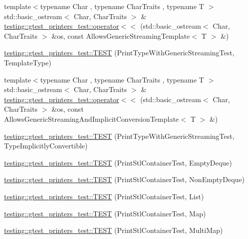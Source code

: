 \begin{DoxyCompactItemize}
\item 
{\footnotesize template$<$typename Char , typename Char\+Traits , typename T $>$ }\\std\+::basic\+\_\+ostream$<$ Char, Char\+Traits $>$ \& \mbox{\hyperlink{namespacetesting_1_1gtest__printers__test_a5464168e925b1adf29986c8e544e908e}{testing\+::gtest\+\_\+printers\+\_\+test\+::operator$<$$<$}} (std\+::basic\+\_\+ostream$<$ Char, Char\+Traits $>$ \&os, const Allows\+Generic\+Streaming\+Template$<$ T $>$ \&)
\item 
\mbox{\hyperlink{namespacetesting_1_1gtest__printers__test_a6e180c85f307712a995985f7bc735fd1}{testing\+::gtest\+\_\+printers\+\_\+test\+::\+T\+E\+ST}} (Print\+Type\+With\+Generic\+Streaming\+Test, Template\+Type)
\item 
{\footnotesize template$<$typename Char , typename Char\+Traits , typename T $>$ }\\std\+::basic\+\_\+ostream$<$ Char, Char\+Traits $>$ \& \mbox{\hyperlink{namespacetesting_1_1gtest__printers__test_a09eedfbca613302efe6438d2a537f419}{testing\+::gtest\+\_\+printers\+\_\+test\+::operator$<$$<$}} (std\+::basic\+\_\+ostream$<$ Char, Char\+Traits $>$ \&os, const Allows\+Generic\+Streaming\+And\+Implicit\+Conversion\+Template$<$ T $>$ \&)
\item 
\mbox{\hyperlink{namespacetesting_1_1gtest__printers__test_a68877c5e1ec7a53281798310c30e1776}{testing\+::gtest\+\_\+printers\+\_\+test\+::\+T\+E\+ST}} (Print\+Type\+With\+Generic\+Streaming\+Test, Type\+Implicitly\+Convertible)
\item 
\mbox{\hyperlink{namespacetesting_1_1gtest__printers__test_a1ce10b8a3634e0f6bfbfbb5888c04a95}{testing\+::gtest\+\_\+printers\+\_\+test\+::\+T\+E\+ST}} (Print\+Stl\+Container\+Test, Empty\+Deque)
\item 
\mbox{\hyperlink{namespacetesting_1_1gtest__printers__test_a249d482cf4a1525bd043489dcbd3e200}{testing\+::gtest\+\_\+printers\+\_\+test\+::\+T\+E\+ST}} (Print\+Stl\+Container\+Test, Non\+Empty\+Deque)
\item 
\mbox{\hyperlink{namespacetesting_1_1gtest__printers__test_aaa135672ff79ecaef82c6046f2ab8d29}{testing\+::gtest\+\_\+printers\+\_\+test\+::\+T\+E\+ST}} (Print\+Stl\+Container\+Test, List)
\item 
\mbox{\hyperlink{namespacetesting_1_1gtest__printers__test_a3d701a1866f260a42411e9041894c49c}{testing\+::gtest\+\_\+printers\+\_\+test\+::\+T\+E\+ST}} (Print\+Stl\+Container\+Test, Map)
\item 
\mbox{\hyperlink{namespacetesting_1_1gtest__printers__test_a8a498c956a5b1c0358d126e1ad56fac0}{testing\+::gtest\+\_\+printers\+\_\+test\+::\+T\+E\+ST}} (Print\+Stl\+Container\+Test, Multi\+Map)

\end{DoxyCompactItemize}
